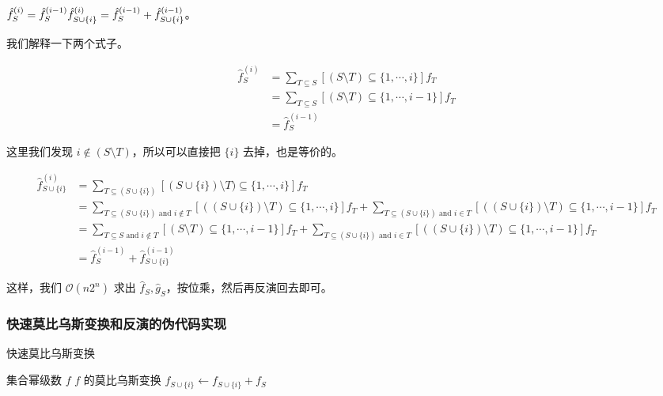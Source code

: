 \documentclass{article}
\begin{document}
$\hat f_S^{(i)}=\hat f_S^{(i-1)} \\ \hat f_{S\cup\{i\}}^{(i)}=\hat f_S^{(i-1)}+\hat f_{S\cup\{i\}}^{(i-1)}$。

我们解释一下两个式子。

$$\begin{aligned}
\hat f_S^{(i)} &= \sum_{T \subseteq S}[(S \setminus T)\subseteq\{1,\cdots,i\}]f_T\\
               &= \sum_{T \subseteq S}[(S \setminus T)\subseteq\{1,\cdots,i-1\}]f_T\\
               &= \hat f_S^{(i-1)}
\end{aligned}$$

这里我们发现 $i \notin (S \setminus T)$，所以可以直接把 $\{i\}$ 去掉，也是等价的。

$$
\begin{aligned}
\hat f_{S\cup\{i\}}^{(i)} &= \sum_{T \subseteq (S\cup\{i\})}[(S\cup\{i\}) \setminus T)\subseteq\{1,\cdots,i\}]f_T\\
               &= \sum_{T \subseteq (S\cup\{i\}) \text{ and } i \notin T}[((S\cup\{i\}) \setminus T)\subseteq\{1,\cdots,i\}]f_T+\sum_{T \subseteq (S\cup\{i\}) \text{ and } i \in T}[((S\cup\{i\}) \setminus T)\subseteq\{1,\cdots,i-1\}]f_T\\
               &= \sum_{T \subseteq S \text{ and } i \notin T}[(S \setminus T)\subseteq\{1,\cdots,i-1\}]f_T+\sum_{T \subseteq (S\cup\{i\}) \text{ and } i \in T}[((S\cup\{i\}) \setminus T)\subseteq\{1,\cdots,i-1\}]f_T\\
               &= \hat f_S^{(i-1)}+\hat f_{S \cup \{i\}}^{(i-1)}
\end{aligned}
$$

这样，我们 $\mathcal{O}(n2^n)$ 求出 $\hat f_S,\hat g_S$，按位乘，然后再反演回去即可。


\subsubsection*{快速莫比乌斯变换和反演的伪代码实现}

\begin{algorithm}
    \caption{快速莫比乌斯变换}
    \begin{algorithmic}[1]
        \Require 集合幂级数 $f$
        \Ensure $f$ 的莫比乌斯变换
                    \State $f_{S \cup \{i\}} \gets f_{S \cup \{i\}} + f_{S}$
                \EndFor
            \EndFor
            \State {}
        \EndFunction
    \end{algorithmic}
\end{algorithm}
\end{document}
